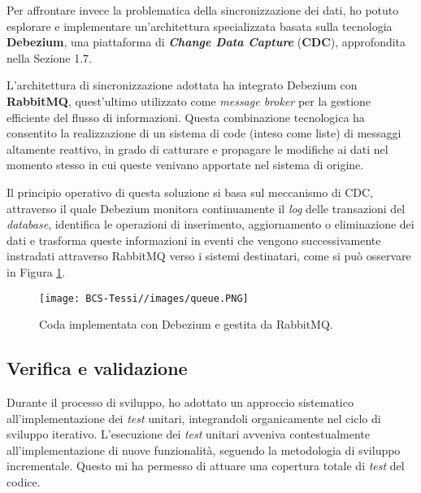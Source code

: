         \vspace{0.2 em}
        \noindent Per affrontare invece la problematica della sincronizzazione dei dati, ho potuto esplorare e implementare un'architettura specializzata basata sulla tecnologia \textbf{Debezium}, una piattaforma di \textbf{\textit{Change Data Capture}} (\textbf{CDC}), approfondita nella Sezione 1.7. 

        \vspace{0.2 em}
        \noindent L'architettura di sincronizzazione adottata ha integrato Debezium con \textbf{RabbitMQ}, quest'ultimo utilizzato come \textit{message broker }per la gestione efficiente del flusso di informazioni. Questa combinazione tecnologica ha consentito la realizzazione di un sistema di code (inteso come liste) di messaggi altamente reattivo, in grado di catturare e propagare le modifiche ai dati nel momento stesso in cui queste venivano apportate nel sistema di origine.

        \vspace{0.2 em}
        \noindent Il principio operativo di questa soluzione si basa sul meccanismo di CDC, attraverso il quale Debezium monitora continuamente il \textit{log} delle transazioni del \textit{database}, identifica le operazioni di inserimento, aggiornamento o eliminazione dei dati e trasforma queste informazioni in eventi che vengono successivamente instradati attraverso RabbitMQ verso i sistemi destinatari, come si può osservare in Figura \ref{fig:queue}.

        \begin{figure}[H]
            \centering
            \texttt{[image: BCS-Tessi//images/queue.PNG]}
            \caption{Coda implementata con Debezium e gestita da RabbitMQ.}
            \label{fig:queue}
        \end{figure}

        
        \subsection{Verifica e validazione}
        Durante il processo di sviluppo, ho adottato un approccio sistematico all'implementazione dei \textit{test} unitari, integrandoli organicamente nel ciclo di sviluppo iterativo. L'esecuzione dei \textit{test} unitari avveniva contestualmente all'implementazione di nuove funzionalità, seguendo la metodologia di sviluppo incrementale. Questo mi ha permesso di attuare una copertura totale di \textit{test} del codice.

